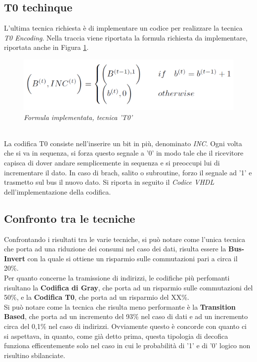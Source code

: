 \subsection{T0 techinque}
L'ultima tecnica richiesta è di implementare un codice per realizzare la tecnica \textit{T0 Encoding}. Nella traccia viene riportata la formula richiesta da implementare, riportata anche in Figura \ref{formula_t0}.\\
\begin{figure}[!htb]
	\centering
	\includegraphics[scale=0.8]{immagini/formula_t0}
	\caption{\textit{Formula implementata, tecnica 'T0'}}
	\label{formula_t0}
\end{figure}
\\
\noindent La codifica T0 consiste nell'inserire un bit in più, denominato \textit{INC}. Ogni volta che si va in sequenza, si forza questo segnale a '0' in modo tale che il ricevitore capisca di dover andare semplicemente in sequenza e si preoccupi lui di incrementare il dato. In caso di brach, salito o subroutine, forzo il segnale ad '1' e trasmetto sul bus il nuovo dato. Si riporta in seguito il \textit{Codice VHDL} dell'implementazione della codifica.

\subsection{Confronto tra le tecniche}
Confrontando i risultati tra le varie tecniche, si può notare come l'unica tecnica che porta ad una riduzione dei consumi nel caso dei dati, risulta essere la \textbf{Bus-Invert} con la quale si ottiene un risparmio sulle commutazioni pari a circa il 20\%. \\ %
Per quanto concerne la tramissione di indirizzi, le codifiche più perfomanti risultano la \textbf{Codifica di Gray}, che porta ad un risparmio sulle commutazioni del 50\%, e la \textbf{Codifica T0}, che porta ad un risparmio del XX\%.\\
Si può notare come la tecnica che risulta meno performante è la \textbf{Transition Based}, che porta ad un incremento del 93\% nel caso di dati e ad un incremento circa del 0,1\% nel caso di indirizzi. Ovviamente questo è concorde con quanto ci si aspettava, in quanto, come già detto prima, questa tipologia di decofica funziona efficentemente solo nel caso in cui le probabilità di '1' e di '0' logico non risultino sbilanciate.

